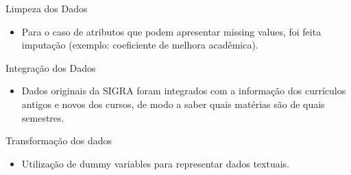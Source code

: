 \begin{frame}{Limpeza dos Dados}
\begin{itemize}[itemsep=3ex]
    \item Para o caso de atributos que podem apresentar missing values, foi feita
        imputação (exemplo: coeficiente de melhora acadêmica).
\end{itemize}
\end{frame}

\begin{frame}{Integração dos Dados}
\begin{itemize}[itemsep=3ex]
    \item Dados originais da SIGRA foram integrados com a informação dos currículos
        antigos e novos dos cursos, de modo a saber quais matérias são de quais
        semestres.
\end{itemize}
\end{frame}

\begin{frame}{Transformação dos dados}
\begin{itemize}[itemsep=3ex]
    \item Utilização de dummy variables para representar dados textuais. 
\end{itemize}
\end{frame}

